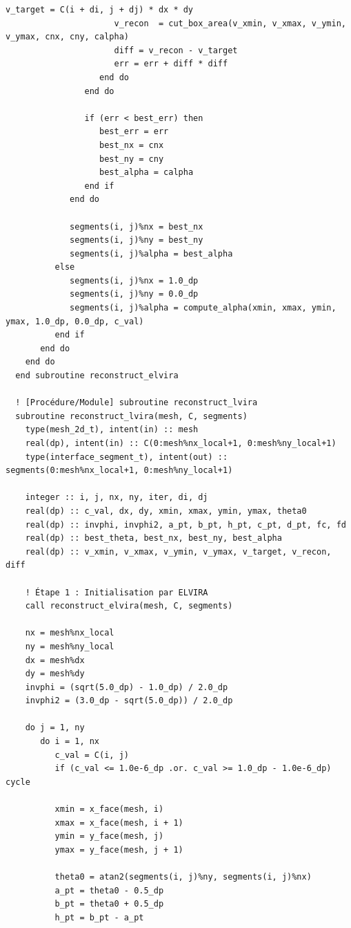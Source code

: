 \documentclass[10pt,a4paper,oneside]{book}
\begin{document}
\begin{lstlisting}[language={[95]Fortran}]
                      v_target = C(i + di, j + dj) * dx * dy
                      v_recon  = cut_box_area(v_xmin, v_xmax, v_ymin, v_ymax, cnx, cny, calpha)
                      diff = v_recon - v_target
                      err = err + diff * diff
                   end do
                end do

                if (err < best_err) then
                   best_err = err
                   best_nx = cnx
                   best_ny = cny
                   best_alpha = calpha
                end if
             end do

             segments(i, j)%nx = best_nx
             segments(i, j)%ny = best_ny
             segments(i, j)%alpha = best_alpha
          else
             segments(i, j)%nx = 1.0_dp
             segments(i, j)%ny = 0.0_dp
             segments(i, j)%alpha = compute_alpha(xmin, xmax, ymin, ymax, 1.0_dp, 0.0_dp, c_val)
          end if
       end do
    end do
  end subroutine reconstruct_elvira

  ! [Procédure/Module] subroutine reconstruct_lvira
  subroutine reconstruct_lvira(mesh, C, segments)
    type(mesh_2d_t), intent(in) :: mesh
    real(dp), intent(in) :: C(0:mesh%nx_local+1, 0:mesh%ny_local+1)
    type(interface_segment_t), intent(out) :: segments(0:mesh%nx_local+1, 0:mesh%ny_local+1)

    integer :: i, j, nx, ny, iter, di, dj
    real(dp) :: c_val, dx, dy, xmin, xmax, ymin, ymax, theta0
    real(dp) :: invphi, invphi2, a_pt, b_pt, h_pt, c_pt, d_pt, fc, fd
    real(dp) :: best_theta, best_nx, best_ny, best_alpha
    real(dp) :: v_xmin, v_xmax, v_ymin, v_ymax, v_target, v_recon, diff

    ! Étape 1 : Initialisation par ELVIRA
    call reconstruct_elvira(mesh, C, segments)

    nx = mesh%nx_local
    ny = mesh%ny_local
    dx = mesh%dx
    dy = mesh%dy
    invphi = (sqrt(5.0_dp) - 1.0_dp) / 2.0_dp
    invphi2 = (3.0_dp - sqrt(5.0_dp)) / 2.0_dp

    do j = 1, ny
       do i = 1, nx
          c_val = C(i, j)
          if (c_val <= 1.0e-6_dp .or. c_val >= 1.0_dp - 1.0e-6_dp) cycle

          xmin = x_face(mesh, i)
          xmax = x_face(mesh, i + 1)
          ymin = y_face(mesh, j)
          ymax = y_face(mesh, j + 1)

          theta0 = atan2(segments(i, j)%ny, segments(i, j)%nx)
          a_pt = theta0 - 0.5_dp
          b_pt = theta0 + 0.5_dp
          h_pt = b_pt - a_pt


\end{lstlisting}
\end{document}

